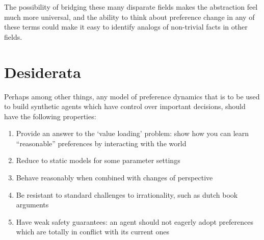 \documentclass{article}
\begin{document}
	The possibility of bridging these many disparate fields makes the abstraction feel much more universal, and the ability to think about preference change in any of these terms could make it easy to identify analogs of non-trivial facts in other fields.
	

%	
%	
%	
	
	

	\section{Desiderata}


	
	Perhaps among other things, any model of preference dynamics that is to be used to build synthetic agents which have control over important decisions, should have the following properties: 
	\begin{enumerate}[noitemsep]
		\item Provide an answer to the `value loading' problem: show how you can learn ``reasonable'' preferences by interacting with the world
		\item Reduce to static models for some parameter settings
		\item Behave reasonably when combined with changes of perspective 
		\item Be resistant to standard challenges to irrationality, such as dutch book arguments
		\item Have weak safety guarantees: an agent should not eagerly adopt preferences which are totally in conflict with its current ones
	\end{enumerate}
	
\end{document}
